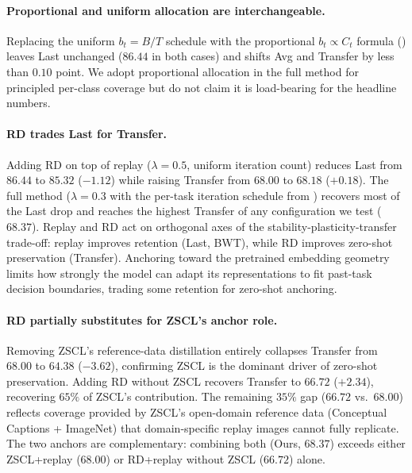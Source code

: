 \documentclass{article}
\begin{document}
  \paragraph{Proportional and uniform allocation are interchangeable.}
  Replacing the uniform $b_t = B/T$ schedule with the proportional
  $b_t \propto C_t$ formula () leaves Last unchanged
  ($86.44$ in both cases) and shifts Avg and Transfer by less than $0.10$ point.
  We adopt proportional allocation in the full method for principled per-class
  coverage but do not claim it is load-bearing for the headline numbers.

  \paragraph{RD trades Last for Transfer.}
  Adding RD on top of replay ($\lambda{=}0.5$, uniform iteration count) reduces
  Last from $86.44$ to $85.32$ ($-1.12$) while raising Transfer from $68.00$ to
  $68.18$ ($+0.18$). The full method ($\lambda{=}0.3$ with the per-task iteration
  schedule from ) recovers most of the Last drop and reaches
  the highest Transfer of any configuration we test ($68.37$). Replay and RD act
  on orthogonal axes of the stability-plasticity-transfer trade-off: replay
  improves retention (Last, BWT), while RD improves zero-shot preservation
  (Transfer). Anchoring toward the pretrained embedding geometry limits how
  strongly the model can adapt its representations to fit past-task decision
  boundaries, trading some retention for zero-shot anchoring.

  \paragraph{RD partially substitutes for ZSCL's anchor role.}
  Removing ZSCL's reference-data distillation entirely collapses Transfer from
  $68.00$ to $64.38$ ($-3.62$), confirming ZSCL is the dominant driver of
  zero-shot preservation. Adding RD without ZSCL recovers Transfer to $66.72$
  ($+2.34$), recovering $65\%$ of ZSCL's contribution. The remaining $35\%$ gap
  ($66.72$ vs.\ $68.00$) reflects coverage provided by ZSCL's open-domain
  reference data (Conceptual Captions + ImageNet) that domain-specific replay
  images cannot fully replicate. The two anchors are complementary: combining both
  (Ours, $68.37$) exceeds either ZSCL+replay ($68.00$) or RD+replay without ZSCL
  ($66.72$) alone.
\end{document}
